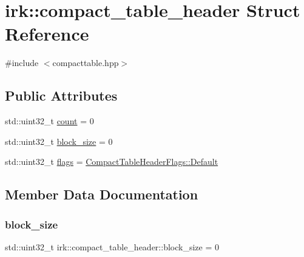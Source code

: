 \hypertarget{structirk_1_1compact__table__header}{}\section{irk\+:\+:compact\+\_\+table\+\_\+header Struct Reference}
\label{structirk_1_1compact__table__header}


{\ttfamily \#include $<$compacttable.\+hpp$>$}

\subsection*{Public Attributes}
\begin{DoxyCompactItemize}
\item 
std\+::uint32\+\_\+t \mbox{\hyperlink{structirk_1_1compact__table__header_a56cc3abb7d6c177bf6ddfbb4a1607281}{count}} = 0
\item 
std\+::uint32\+\_\+t \mbox{\hyperlink{structirk_1_1compact__table__header_aa550cf8ef026351eaadad254f7fbed59}{block\+\_\+size}} = 0
\item 
std\+::uint32\+\_\+t \mbox{\hyperlink{structirk_1_1compact__table__header_ae76b0ba32ba8873575f480e3148f1738}{flags}} = \mbox{\hyperlink{structirk_1_1CompactTableHeaderFlags_a18debbc227dbcb7726817a08b541e5e0}{Compact\+Table\+Header\+Flags\+::\+Default}}
\end{DoxyCompactItemize}


\subsection{Member Data Documentation}
\mbox{\label{structirk_1_1compact__table__header_aa550cf8ef026351eaadad254f7fbed59}} 
\subsubsection{\texorpdfstring{block\+\_\+size}{block\_size}}
{\footnotesize\ttfamily std\+::uint32\+\_\+t irk\+::compact\+\_\+table\+\_\+header\+::block\+\_\+size = 0}

\mbox{\label{structirk_1_1compact__table__header_a56cc3abb7d6c177bf6ddfbb4a1607281}} 
